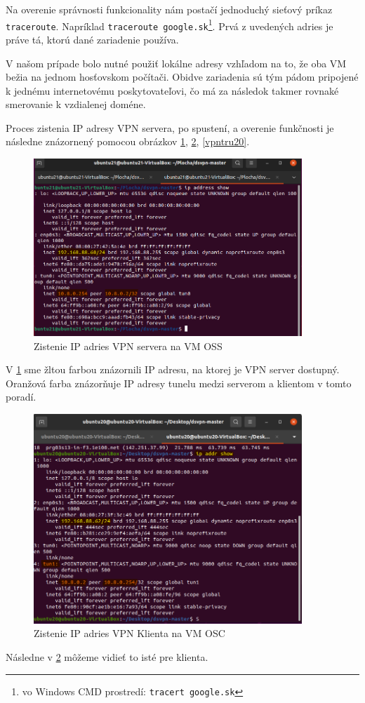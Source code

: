 Na overenie správnosti funkcionality nám postačí jednoduchý sieťový príkaz \lstinline|traceroute|. Napríklad \lstinline|traceroute google.sk|\footnote{vo Windows CMD prostredí: \lstinline|tracert google.sk|}. Prvá z uvedených adries je práve tá, ktorú dané zariadenie používa. 

V našom prípade bolo nutné použiť lokálne adresy vzhľadom na to, že oba VM bežia na jednom hosťovskom počítači. Obidve zariadenia sú tým pádom pripojené k jednému internetovému poskytovateľovi, čo má za následok takmer rovnaké smerovanie k vzdialenej doméne. 

Proces zistenia IP adresy VPN servera, po spustení, a overenie funkčnosti je následne znázornený pomocou obrázkov \ref{ipu21}, \ref{ipu20}, \ref{vpntru20}.

\begin{figure}[!h]
	\centering
	\includegraphics[width=0.9\textwidth]{figures/ipu21}
	\caption{Zistenie IP adries VPN servera na VM OSS}
	\label{ipu21}
\end{figure}
V  \ref{ipu21} sme žltou farbou znázornili IP adresu, na ktorej je VPN server dostupný. Oranžová farba znázorňuje IP adresy tunelu medzi serverom a klientom v tomto poradí. 

\begin{figure}[!h]
	\centering
	\includegraphics[width=0.9\textwidth]{figures/ipu20}
	\caption{Zistenie IP adries VPN Klienta na VM OSC}
	\label{ipu20}
\end{figure}
Následne v \ref{ipu20} môžeme vidieť to isté pre klienta.
  
